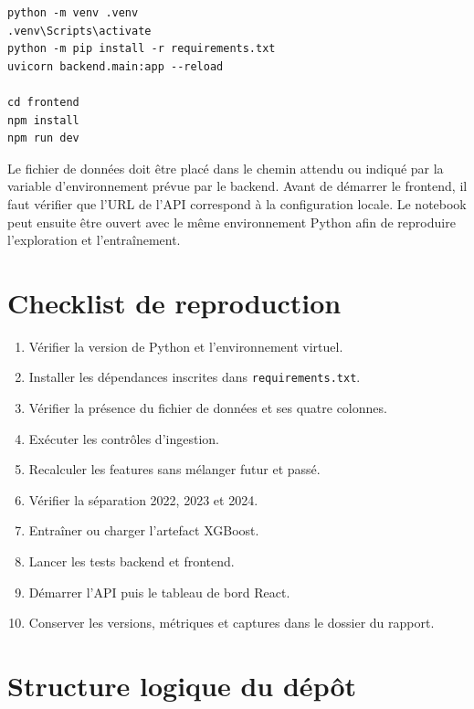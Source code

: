 \documentclass[12pt,a4paper]{report}
\begin{document}
\begin{verbatim}
python -m venv .venv
.venv\Scripts\activate
python -m pip install -r requirements.txt
uvicorn backend.main:app --reload

cd frontend
npm install
npm run dev
\end{verbatim}

Le fichier de données doit être placé dans le chemin attendu ou indiqué par
la variable d'environnement prévue par le backend. Avant de démarrer le
frontend, il faut vérifier que l'URL de l'API correspond à la configuration
locale. Le notebook peut ensuite être ouvert avec le même environnement Python
afin de reproduire l'exploration et l'entraînement.

\section{Checklist de reproduction}

\begin{enumerate}
\item Vérifier la version de Python et l'environnement virtuel.
\item Installer les dépendances inscrites dans \texttt{requirements.txt}.
\item Vérifier la présence du fichier de données et ses quatre colonnes.
\item Exécuter les contrôles d'ingestion.
\item Recalculer les features sans mélanger futur et passé.
\item Vérifier la séparation 2022, 2023 et 2024.
\item Entraîner ou charger l'artefact XGBoost.
\item Lancer les tests backend et frontend.
\item Démarrer l'API puis le tableau de bord React.
\item Conserver les versions, métriques et captures dans le dossier du rapport.
\end{enumerate}

\section{Structure logique du dépôt}
\end{document}
